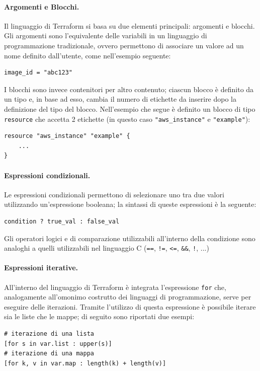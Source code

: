 \paragraph{Argomenti e Blocchi.}

Il linguaggio di Terraform si basa su due elementi principali: argomenti e blocchi.
Gli argomenti sono l'equivalente delle variabili in un linguaggio di programmazione tradizionale, ovvero permettono di associare un valore ad un nome definito dall'utente, come nell'esempio seguente:
\begin{lstlisting}[language=hcl]
image_id = "abc123"
\end{lstlisting}

I blocchi sono invece contenitori per altro contenuto; ciascun blocco è definito da un tipo e, in base ad esso, cambia il numero di etichette da inserire dopo la definizione del tipo del blocco. Nell'esempio che segue è definito un blocco di tipo \verb|resource| che accetta 2 etichette (in questo caso \verb|"aws_instance"| e \verb|"example"|):
\begin{lstlisting}[language=hcl]
resource "aws_instance" "example" {
    ...
}
\end{lstlisting}

\paragraph{Espressioni condizionali.}

Le espressioni condizionali permettono di selezionare uno tra due valori utilizzando un'espressione booleana; la sintassi di queste espressioni è la seguente:
\begin{lstlisting}[language=hcl]
condition ? true_val : false_val
\end{lstlisting}
Gli operatori logici e di comparazione utilizzabili all'interno della condizione sono analoghi a quelli utilizzabili nel linguaggio C (\verb|==|, \verb|!=|, \verb|<=|, \verb|&&|, \verb|!|, ...)

\paragraph{Espressioni iterative.}

All'interno del linguaggio di Terraform è integrata l'espressione \verb|for| che, analogamente all'omonimo costrutto dei linguaggi di programmazione, serve per eseguire delle iterazioni. Tramite l'utilizzo di questa espressione è possibile iterare sia le liste che le mappe; di seguito sono riportati due esempi:
\begin{lstlisting}[language=hcl]
# iterazione di una lista
[for s in var.list : upper(s)]
# iterazione di una mappa
[for k, v in var.map : length(k) + length(v)]
\end{lstlisting}


